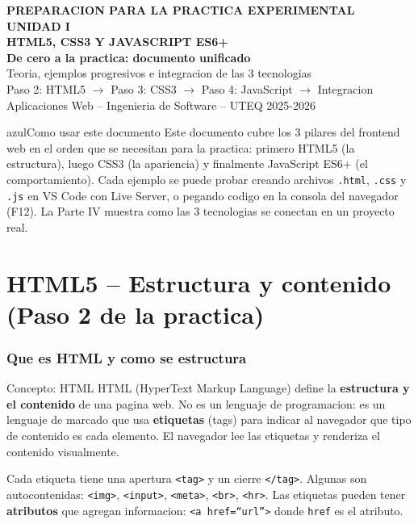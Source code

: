 \documentclass[11pt,a4paper]{article}
\begin{document}
	
	\begin{cajabanda}
		\begin{center}
			{\scriptsize\bfseries PREPARACION PARA LA PRACTICA EXPERIMENTAL UNIDAD I}\\[5pt]
			{\LARGE\bfseries HTML5, CSS3 Y JAVASCRIPT ES6+}\\[3pt]
			{\large\bfseries De cero a la practica: documento unificado}\\[3pt]
			{\normalsize Teoria, ejemplos progresivos e integracion de las 3 tecnologias}\\[3pt]
			{\normalsize Paso 2: HTML5 $\to$ Paso 3: CSS3 $\to$ Paso 4: JavaScript $\to$ Integracion}\\[5pt]
			{\small Aplicaciones Web -- Ingenieria de Software -- UTEQ 2025-2026}
		\end{center}
	\end{cajabanda}
	
	\vspace{0.3cm}
	
	\begin{cajatip}{azul}{Como usar este documento}
		Este documento cubre los 3 pilares del frontend web en el orden que se necesitan para la practica: primero HTML5 (la estructura), luego CSS3 (la apariencia) y finalmente JavaScript ES6+ (el comportamiento). Cada ejemplo se puede probar creando archivos \texttt{.html}, \texttt{.css} y \texttt{.js} en VS Code con Live Server, o pegando codigo en la consola del navegador (F12). La Parte IV muestra como las 3 tecnologias se conectan en un proyecto real.
	\end{cajatip}
	
	\vspace{0.3cm}
	\tableofcontents
	\newpage
	
	\part{HTML5 -- Estructura y contenido (Paso 2 de la practica)}
	
	\section{Que es HTML y como se estructura}
	
	\begin{cajaconcepto}{Concepto: HTML}
		HTML (HyperText Markup Language) define la \textbf{estructura y el contenido} de una pagina web. No es un lenguaje de programacion: es un lenguaje de marcado que usa \textbf{etiquetas} (tags) para indicar al navegador que tipo de contenido es cada elemento. El navegador lee las etiquetas y renderiza el contenido visualmente.
		
		Cada etiqueta tiene una apertura \texttt{<tag>} y un cierre \texttt{</tag>}. Algunas son autocontenidas: \texttt{<img>}, \texttt{<input>}, \texttt{<meta>}, \texttt{<br>}, \texttt{<hr>}. Las etiquetas pueden tener \textbf{atributos} que agregan informacion: \texttt{<a href=``url''>} donde \texttt{href} es el atributo.
	\end{cajaconcepto}
	
\end{document}
